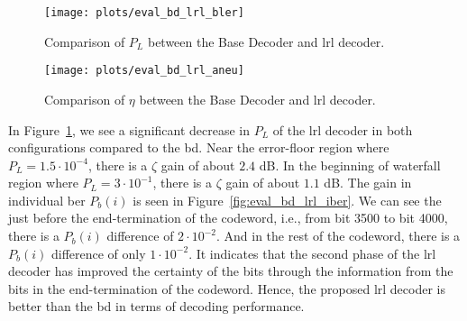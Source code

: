 \begin{figure}[htbp]
  \centering
  \texttt{[image: plots/eval\_bd\_lrl\_bler]}
  \caption[Comparison of \acrshort{bler} between the Base Decoder and \acrshort{lrl} decoder.]{Comparison of $P_L$ between the Base Decoder and \gls{lrl} decoder.}
  \label{fig:eval_bd_lrl_bler}
\end{figure}
\begin{figure}[htbp]
  \centering
  \texttt{[image: plots/eval\_bd\_lrl\_aneu]}
  \caption[Comparison of \acrshort{aneu} between the Base Decoder and \acrshort{lrl} decoder.]{Comparison of $\eta$ between the Base Decoder and \gls{lrl} decoder.}
  \label{fig:eval_bd_lrl_aneu}
\end{figure}

In Figure~\ref{fig:eval_bd_lrl_bler}, we see a significant decrease in $P_L$ of the \gls{lrl} decoder in both configurations compared to the \gls{bd}. Near the error-floor region where $P_L=1.5\cdot 10^{-4}$, there is a $\zeta$ gain of about $2.4$ dB. In the beginning of waterfall region where $P_L=3\cdot 10^{-1}$, there is a $\zeta$ gain of about $1.1$ dB. The gain in individual \gls{ber} $P_b(i)$ is seen in Figure~\ref{fig:eval_bd_lrl_iber}. We can see the just before the end-termination of the codeword, i.e., from bit 3500 to bit 4000, there is a $P_b(i)$ difference of $2\cdot 10^{-2}$. And in the rest of the codeword, there is a $P_b(i)$ difference of only $1\cdot 10^{-2}$. It indicates that the second phase of the \gls{lrl} decoder has improved the certainty of the bits through the information from the bits in the end-termination of the codeword. Hence, the proposed \gls{lrl} decoder is better than the \gls{bd} in terms of decoding performance.

